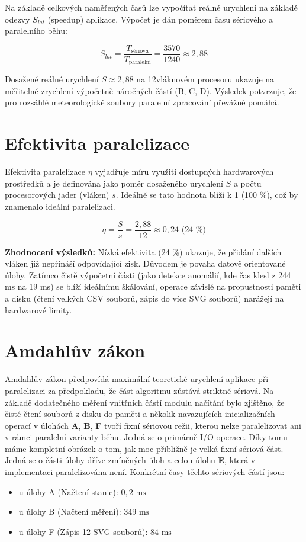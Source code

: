 \documentclass[10pt, a4paper]{report}
\begin{document}
	Na základě celkových naměřených časů lze vypočítat reálné urychlení na základě odezvy $S_{lat}$ (speedup) aplikace. Výpočet je dán poměrem času sériového a paralelního běhu:
	
	\begin{equation}
		S_{lat} = \frac{T_{\text{sériová}}}{T_{\text{paralelní}}} = \frac{3570}{1240} \approx 2,88
	\end{equation}
	
	Dosažené reálné urychlení $S \approx 2,88$ na 12vláknovém procesoru ukazuje na měřitelné zrychlení výpočetně náročných částí (B, C, D). Výsledek potvrzuje, že pro rozsáhlé meteorologické soubory paralelní zpracování převážně pomáhá.
	
	\section{Efektivita paralelizace}
	
	Efektivita paralelizace $\eta$ vyjadřuje míru využití dostupných hardwarových prostředků a je definována jako poměr dosaženého urychlení $S$ a počtu procesorových jader (vláken) $s$. Ideálně se tato hodnota blíží k 1 (100 \%), což by znamenalo ideální paralelizaci.
	
	\begin{equation}
		\eta = \frac{S}{s} = \frac{2,88}{12} \approx 0,24 \text{ (24 \%)}
	\end{equation}
	
	\textbf{Zhodnocení výsledků:} Nízká efektivita (24 \%) ukazuje, že přidání dalších vláken již nepřináší odpovídající zisk. Důvodem je povaha datově orientované úlohy. Zatímco čistě výpočetní části (jako detekce anomálií, kde čas klesl z 244 ms na 19 ms) se blíží ideálnímu škálování, operace závislé na propustnosti paměti a disku (čtení velkých CSV souborů, zápis do více SVG souborů) narážejí na hardwarové limity.
	
	\section{Amdahlův zákon}
	
	Amdahlův zákon předpovídá maximální teoretické urychlení aplikace při paralelizaci za předpokladu, že část algoritmu zůstává striktně sériová. Na základě dodatečného měření vnitřních částí modulu načítání bylo zjištěno, že čisté čtení souborů z disku do paměti a několik navazujících inicializačních operací v úlohách \textbf{A}, \textbf{B}, \textbf{F} tvoří fixní sériovou režii, kterou nelze paralelizovat ani v rámci paralelní varianty běhu. Jedná se o primárně I/O operace. Díky tomu máme kompletní obrázek o tom, jak moc přibližně je velká fixní sériová část. Jedná se o části úlohy dříve zmíněných úloh a celou úlohu \textbf{E}, která v implementaci paralelizována není. Konkrétní časy těchto sériových částí jsou:
	\begin{itemize}
		\item u úlohy A (Načtení stanic): $0,2 \text{ ms}$
		\item u úlohy B (Načtení měření): $349 \text{ ms}$
		\item u úlohy F (Zápis 12 SVG souborů): $84 \text{ ms}$
	\end{itemize}
	
\end{document}
